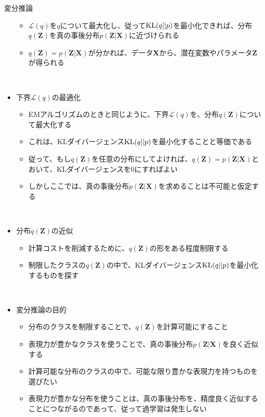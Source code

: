 \documentclass[dvipdfmx,notheorems,t]{beamer}
\begin{document}
\begin{frame}{変分推論}
\begin{itemize}
\begin{itemize}
		\item $\mathcal{L}(q)$を$q$について最大化し、従って$\operatorname{KL} (q || p)$を最小化できれば、分布$q(\bm{Z})$を真の事後分布$p(\bm{Z} | \bm{X})$に近づけられる
		\item $q(\bm{Z}) = p(\bm{Z} | \bm{X})$が分かれば、データ$\bm{X}$から、\color{red}潜在変数やパラメータ$\bm{Z}$が得られる\normalcolor
	\end{itemize} \
	
	\framebreak
	
	\item 下界$\mathcal{L}(q)$の最適化
	\begin{itemize}
		\item EMアルゴリズムのときと同じように、下界$\mathcal{L}(q)$を、分布$q(\bm{Z})$について最大化する
		\item これは、KLダイバージェンス$\operatorname{KL} (q || p)$を最小化することと等価である
		\newline
		\item 従って、\color{red}もし$q(\bm{Z})$を任意の分布にしてよければ\normalcolor 、$q(\bm{Z}) = p(\bm{Z} | \bm{X})$とおいて、KLダイバージェンスを$0$にすればよい
		\newline
		\item しかしここでは、\color{red}真の事後分布$p(\bm{Z} | \bm{X})$を求めることは不可能\normalcolor と仮定する
	\end{itemize} \
	
	\item 分布$q(\bm{Z})$の近似
	\begin{itemize}
		\item 計算コストを削減するために、$q(\bm{Z})$の形をある程度\alert{制限する}
		\item 制限したクラスの$q(\bm{Z})$の中で、KLダイバージェンス$\operatorname{KL} (q || p)$を最小化するものを探す
	\end{itemize} \
	
	\item 変分推論の目的
	\begin{itemize}
		\item 分布のクラスを制限することで、$q(\bm{Z})$を計算可能にすること
		\item 表現力が豊かなクラスを使うことで、真の事後分布$p(\bm{Z} | \bm{X})$を良く近似する
		\newline
		\item 計算可能な分布のクラスの中で、\alert{可能な限り豊かな表現力を持つ}ものを選びたい
		\item 表現力が豊かな分布を使うことは、真の事後分布を、精度良く近似することにつながるのであって、従って\alert{過学習は発生しない}
	\end{itemize}
\end{itemize}

\end{frame}
\end{document}
